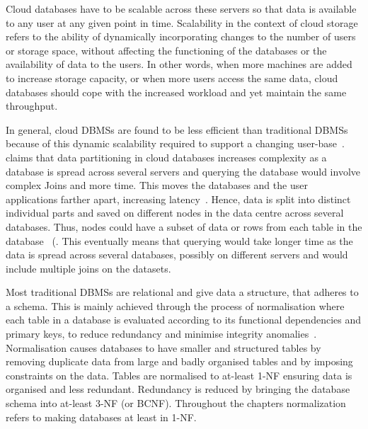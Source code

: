 Cloud databases have to be scalable across these servers so that data is
available to any user at any given point in time.  Scalability in the context of
cloud storage refers to the ability of dynamically incorporating changes to the
number of users or storage space,   without affecting the functioning of the
databases or the availability of data to the users.  In other words,   when more
machines are added to increase storage capacity,   or when more users access the
same data,   cloud databases should cope with the increased workload and yet
maintain the same throughput.

In general,   cloud \acp{DBMS} are found to be less efficient than traditional
\acp{DBMS} because of this dynamic scalability required to support a changing
user-base~\citep{Hogan,Stonebraker,Abadi}.
\citet{Hogan} claims that data partitioning in cloud
databases increases complexity as a database is spread across several servers and querying the database would involve complex Joins and
more time.  This moves the databases and the user applications farther apart,
increasing latency~\citep{Murphy}.  Hence,   data is split
into distinct individual parts and saved on different nodes in the data centre across
several databases.
Thus,   nodes could have a subset of data or rows from each table in the
database~\citep{DeWitt} (. This eventually means
that querying would take longer time as the data is spread across several databases,  
possibly on different servers and would include multiple joins on the datasets.

Most traditional \acp{DBMS} are relational and give data a structure,   that
adheres to a schema.  This is mainly achieved through the process of
normalisation where each table in a database is evaluated according to its
functional dependencies and primary keys,   to reduce redundancy and minimise
integrity anomalies~\citep{Navathe}.  Normalisation causes
databases to have smaller and structured tables by removing duplicate data from large and
badly organised tables and by imposing constraints on the data.  Tables are
normalised to at-least \ac{1-NF} ensuring data is organised and less redundant.
Redundancy is reduced by bringing the database schema into at-least \ac{3-NF}
(or \ac{BCNF}).
Throughout the chapters normalization refers to making databases at least in
\ac{1-NF}.

